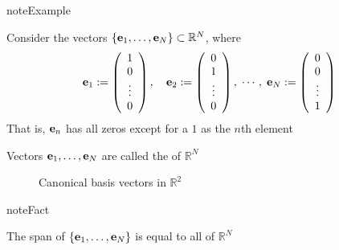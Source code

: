 \documentclass[letterpaper,10pt,english]{jupyterBook}
\begin{document}
\begin{sphinxadmonition}{note}{Example}

\sphinxAtStartPar
Consider the vectors \(\{{\bf e}_1, \ldots, {\bf e}_N\} \subset \mathbb{R}^N\), where
\begin{equation*}
\begin{split}
%
{\bf e}_1 := 
\left(
\begin{array}{c}
1 \\
0 \\
\vdots \\
0
\end{array}
\right),
\quad 
{\bf e}_2 := 
\left(
\begin{array}{c}
0 \\
1 \\
\vdots \\
0
\end{array}
\right),
\; 
\cdots,
\;
{\bf e}_N := 
\left(
\begin{array}{c}
0 \\
0 \\
\vdots \\
1
\end{array}
\right)
%
\end{split}
\end{equation*}
\sphinxAtStartPar
That is, \({\bf e}_n\) has all zeros except for a \(1\) as the \(n\)\sphinxhyphen{}th element
\end{sphinxadmonition}

\sphinxAtStartPar
Vectors \({\bf e}_1, \ldots, {\bf e}_N\) are called the  of \(\mathbb{R}^N\)

\begin{figure}[htbp]
\centering
\capstart

\noindent{}
\caption{Canonical basis vectors in \(\mathbb{R}^2\)}\label{\detokenize{05.linear_algebra:f-vec-canon}}\end{figure}

\begin{sphinxadmonition}{note}{Fact}

\sphinxAtStartPar
The span of \(\{{\bf e}_1, \ldots, {\bf e}_N\}\) is equal to all of \(\mathbb{R}^N\)
\end{sphinxadmonition}
\end{document}
